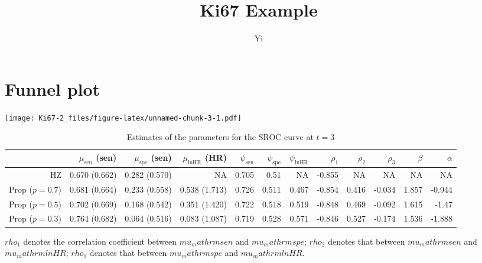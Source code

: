 \documentclass[
]{article}
\title{Ki67 Example}
\author{Yi}
\date{}
\begin{document}
\maketitle

\hypertarget{funnel-plot}{%
\section{Funnel plot}\label{funnel-plot}}

\texttt{[image: Ki67-2\_files/figure-latex/unnamed-chunk-3-1.pdf]}

\begin{table}[!htb]

\caption{\label{tab:sroc-ki67-3}Estimates of the parameters for the SROC curve at $t=3$}
\centering
\begin{threeparttable}
\begin{tabular}[t]{rrrrrrrrrrrr}
\toprule
 & $\mu_\mathrm{sen}$ (sen) & $\mu_\mathrm{spe}$ (sen) & $\mu_\mathrm{lnHR}$ (HR) & $\psi_\mathrm{sen}$ & $\psi_\mathrm{spe}$ & $\psi_\mathrm{lnHR}$ & $\rho_1$ & $\rho_2$ & $\rho_3$ & $\beta$ & $\alpha$\\
\midrule
HZ & 0.670 (0.662) & 0.282 (0.570) & NA & 0.705 & 0.51 & NA & -0.855 & NA & NA & NA & NA\\
Prop ($p=0.7$) & 0.681 (0.664) & 0.233 (0.558) & 0.538 (1.713) & 0.726 & 0.511 & 0.467 & -0.854 & 0.416 & -0.034 & 1.857 & -0.944\\
Prop ($p=0.5$) & 0.702 (0.669) & 0.168 (0.542) & 0.351 (1.420) & 0.722 & 0.518 & 0.519 & -0.848 & 0.469 & -0.092 & 1.615 & -1.47\\
Prop ($p=0.3$) & 0.764 (0.682) & 0.064 (0.516) & 0.083 (1.087) & 0.719 & 0.528 & 0.571 & -0.846 & 0.527 & -0.174 & 1.536 & -1.888\\
\bottomrule
\end{tabular}
\begin{tablenotes}
\item 
            $rho_1$ denotes the correlation coefficient between $mu_mathrm{sen}$ and $mu_mathrm{spe}$;
            $rho_2$ denotes that between $mu_mathrm{sen}$ and $mu_mathrm{lnHR}$;
            $rho_1$ denotes that between $mu_mathrm{spe}$ and $mu_mathrm{lnHR}$.
\end{tablenotes}
\end{threeparttable}
\end{table}
\end{document}
